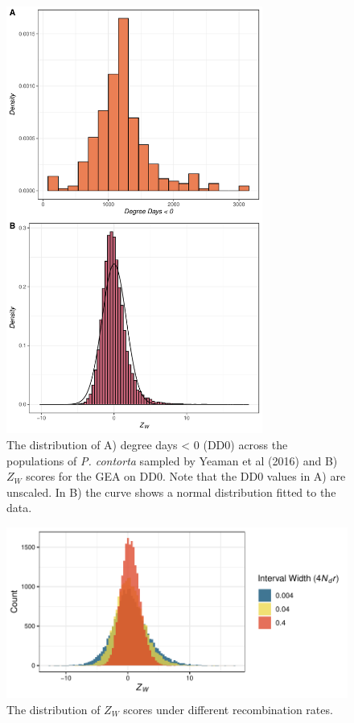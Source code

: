 \documentclass[10pt,twoside,lineno, twocolumn]{GSA_format}
\begin{document}
\pagebreak
\begin{figure}[H]
  \includegraphics[width=0.75\textwidth,height=0.75\textheight,keepaspectratio]{../dataAnalsis/pineAnalysis_SuppFig.pdf}
  \caption{The distribution of A) degree days < 0 (DD0) across the populations of \textit{P. contorta} sampled by Yeaman et al (2016) and B) $Z_W$ scores for the GEA on DD0. Note that the DD0 values in A) are unscaled. In B) the curve shows a normal distribution fitted to the data.}

  \label{fig:lodgepoleDescriptives}
\end{figure}



\begin{figure}
  \includegraphics[width=\textwidth]{Plots/recombinationRateHistogram.pdf} 
  \caption{The distribution of $Z_W$ scores under different recombination rates.}
  \label{fig:WZA_Recombination}
\end{figure}
\end{document}
